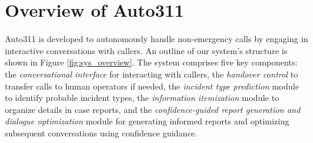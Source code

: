 \section{Overview of Auto311}

Auto311 is developed to autonomously handle non-emergency calls by engaging in interactive conversations with callers. An outline of our system's structure is shown in Figure \ref{fig:sys_overview}. The system comprises five key components: the \textit{conversational interface} for interacting with callers, the \textit{handover control} to transfer calls to human operators if needed, the \textit{incident type prediction} module to identify probable incident types, the \textit{information itemization} module to organize details in case reports, and the \textit{confidence-guided report generation and dialogue optimization} module for generating informed reports and optimizing subsequent conversations using confidence guidance.




